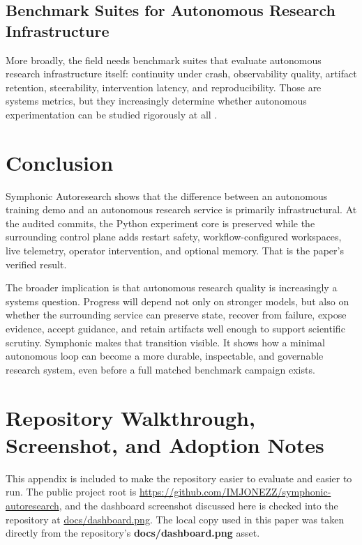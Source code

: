 \documentclass[conference]{IEEEtran}
\newcommand{\file}[1]{{\ttfamily\bfseries\textcolor{accentteal}{#1}}}
\newcommand{\projecturl}{\href{https://github.com/IMJONEZZ/symphonic-autoresearch}{\textcolor{accentteal}{https://github.com/IMJONEZZ/symphonic-autoresearch}}}
\begin{document}
\subsection{Benchmark Suites for Autonomous Research Infrastructure}
More broadly, the field needs benchmark suites that evaluate autonomous research infrastructure itself: continuity under crash, observability quality, artifact retention, steerability, intervention latency, and reproducibility. Those are systems metrics, but they increasingly determine whether autonomous experimentation can be studied rigorously at all \cite{ref_hidden_debt,ref_ml_test_score,ref_bouthillier}.

\balance
\section{Conclusion}
Symphonic Autoresearch shows that the difference between an autonomous training demo and an autonomous research service is primarily infrastructural. At the audited commits, the Python experiment core is preserved while the surrounding control plane adds restart safety, workflow-configured workspaces, live telemetry, operator intervention, and optional memory. That is the paper's verified result.

The broader implication is that autonomous research quality is increasingly a systems question. Progress will depend not only on stronger models, but also on whether the surrounding service can preserve state, recover from failure, expose evidence, accept guidance, and retain artifacts well enough to support scientific scrutiny. Symphonic makes that transition visible. It shows how a minimal autonomous loop can become a more durable, inspectable, and governable research system, even before a full matched benchmark campaign exists.

\clearpage
\onecolumn
\appendices
\section{Repository Walkthrough, Screenshot, and Adoption Notes}
This appendix is included to make the repository easier to evaluate and easier to run. The public project root is \projecturl, and the dashboard screenshot discussed here is checked into the repository at \href{https://github.com/IMJONEZZ/symphonic-autoresearch/blob/main/docs/dashboard.png}{\textcolor{accentteal}{docs/dashboard.png}}. The local copy used in this paper was taken directly from the repository's \file{docs/dashboard.png} asset.
\end{document}
